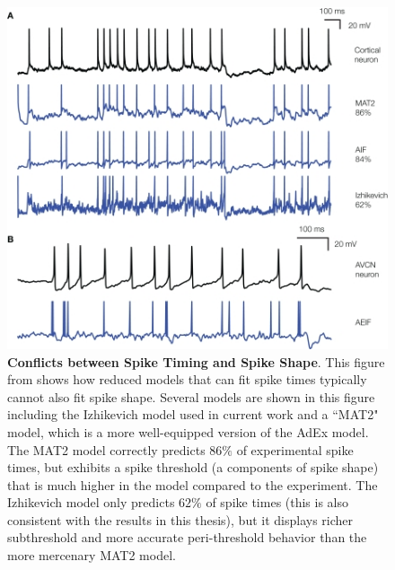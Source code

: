 \begin{figure}
    \centering
    \includegraphics[scale=5.0]{figures/IZHIkevich_fit_60Adexp_80.jpg}
    \caption[Model Fits in Prior Work]{\textbf{Conflicts between Spike Timing and Spike Shape}.
    This figure from  \cite{rossant2011fitting} shows how reduced models that can fit spike times typically cannot also fit spike shape.
    Several models are shown in this figure including the Izhikevich model used in current work and a ``MAT2" model, which is a more well-equipped version of the AdEx model.
    The MAT2 model correctly predicts $86\%$ of experimental spike times, but exhibits a spike threshold (a components of spike shape) that is much higher in the model compared to the experiment.
    The Izhikevich model only predicts $62\%$ of spike times (this is also consistent with the results in this thesis), but it displays richer subthreshold and more accurate peri-threshold behavior than the more mercenary MAT2 model.} 
    \label{fig:rossant-fits}
\end{figure}

